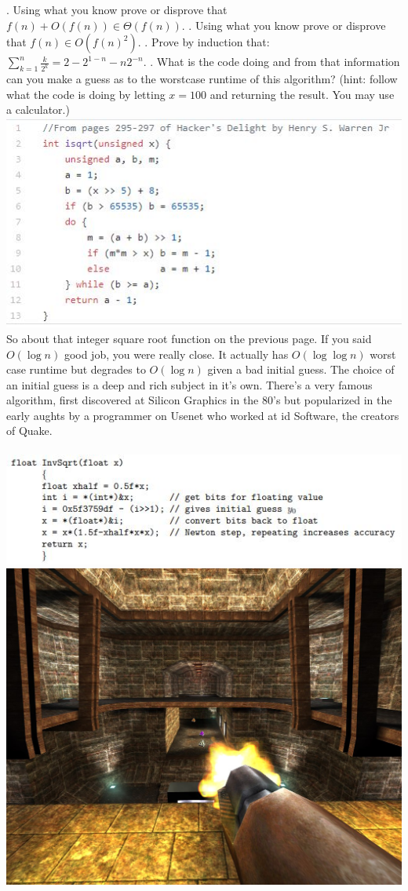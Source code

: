 \documentclass[12pt]{article}
\begin{document}
\newpage
{}. Using what you know prove or disprove that $f(n) + O(f(n)) \in \Theta(f(n))$.
\newpage
{}. Using what you know prove or disprove that $f(n)\in O(f(n)^2)$.
\newpage
{}. Prove by induction that: $\sum\limits_{k=1}^{n}{\frac{k}{2^k}}=2-2^{1-n}-n2^{-n}$.
\newpage
{}. What is the code doing and from that information can you make a guess as to the worstcase runtime of this algorithm? (hint: follow what the code is doing by letting $x = 100$ and returning the result. You may use a calculator.)\\
\includegraphics[width=\linewidth]{isqrt.jpg}
\newpage
\noindent So about that integer square root function on the previous page. If you said $O(\log{n})$ good job, you were really close. It actually has $O(\log{\log{n}})$ worst case runtime but degrades to $O(\log{n})$ given a bad initial guess. The choice of an initial guess is a deep and rich subject in it's own. There's a very famous algorithm, first discovered at Silicon Graphics in the 80's but popularized in the early aughts by a programmer on Usenet who worked at id Software, the creators of Quake. \\\\
\includegraphics[scale =0.65]{fisqrt.jpg}  \includegraphics[scale =0.095]{qk.jpg}
\end{document}
